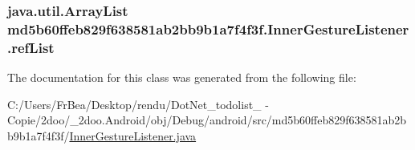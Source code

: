 \hypertarget{classmd5b60ffeb829f638581ab2bb9b1a7f4f3f_1_1_inner_gesture_listener_cfa733c8a1acdacd60c262d75991bf59}{
\subsubsection[{refList}]{\setlength{\rightskip}{0pt plus 5cm}java.util.ArrayList {\bf md5b60ffeb829f638581ab2bb9b1a7f4f3f.InnerGestureListener.refList}}}
\label{classmd5b60ffeb829f638581ab2bb9b1a7f4f3f_1_1_inner_gesture_listener_cfa733c8a1acdacd60c262d75991bf59}




The documentation for this class was generated from the following file:\begin{CompactItemize}
\item 
C:/Users/FrBea/Desktop/rendu/DotNet\_\-todolist\_ - Copie/2doo/\_\-2doo.Android/obj/Debug/android/src/md5b60ffeb829f638581ab2bb9b1a7f4f3f/\hyperlink{_inner_gesture_listener_8java}{InnerGestureListener.java}\end{CompactItemize}
